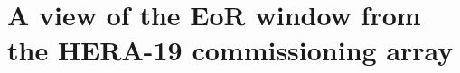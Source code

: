 \chapter{A view of the EoR window from the HERA-19 commissioning array}
\label{chapter:eor_window_HERA}